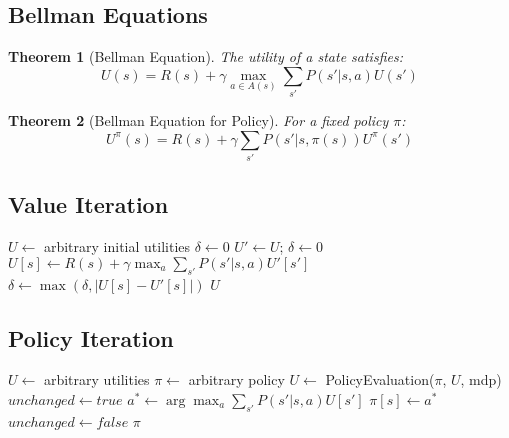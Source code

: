 \documentclass[11pt,letterpaper]{article}
\newtheorem{theorem}{Theorem}[section]
\begin{document}
\subsection{Bellman Equations}

\begin{theorem}[Bellman Equation]
The utility of a state satisfies:
$$U(s) = R(s) + \gamma \max_{a \in A(s)} \sum_{s'} P(s'|s,a) U(s')$$
\end{theorem}

\begin{theorem}[Bellman Equation for Policy]
For a fixed policy $\pi$:
$$U^\pi(s) = R(s) + \gamma \sum_{s'} P(s'|s,\pi(s)) U^\pi(s')$$
\end{theorem}

\subsection{Value Iteration}

\begin{algorithm}
\caption{Value Iteration}
\begin{algorithmic}[1]
    \State $U \gets$ arbitrary initial utilities
    \State $\delta \gets 0$
    \Repeat
        \State $U' \gets U$; $\delta \gets 0$
            \State $U[s] \gets R(s) + \gamma \max_{a} \sum_{s'} P(s'|s,a) U'[s']$
            \State $\delta \gets \max(\delta, |U[s] - U'[s]|)$
        \EndFor
    \State \Return $U$
\EndFunction
\end{algorithmic}
\end{algorithm}

\subsection{Policy Iteration}

\begin{algorithm}
\caption{Policy Iteration}
\begin{algorithmic}[1]
    \State $U \gets$ arbitrary utilities
    \State $\pi \gets$ arbitrary policy
    \Repeat
        \State $U \gets$ PolicyEvaluation($\pi$, $U$, mdp)
        \State $unchanged \gets true$
            \State $a^* \gets \arg\max_a \sum_{s'} P(s'|s,a) U[s']$
                \State $\pi[s] \gets a^*$
                \State $unchanged \gets false$
            \EndIf
        \EndFor
    \State \Return $\pi$
\EndFunction
\end{algorithmic}
\end{algorithm}
\end{document}
